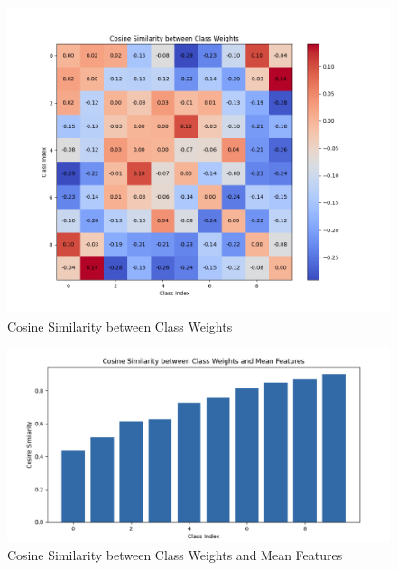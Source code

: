 \documentclass{article}
\begin{document}
\begin{multicols}{2}
\columnbreak
\begin{figure}[H]
\centering
\includegraphics[width=\linewidth]{Plot/VS/stage/cos_VS_5000_50_epoch_199.png}
\caption{Cosine Similarity between Class Weights}
\end{figure}
\begin{figure}[H]
\centering
\includegraphics[width=\linewidth]{Plot/VS_res50/Wi_Hi_res50.png}
\caption{Cosine Similarity between Class Weights and Mean Features}
\end{figure}

\end{multicols} %
\end{document}
